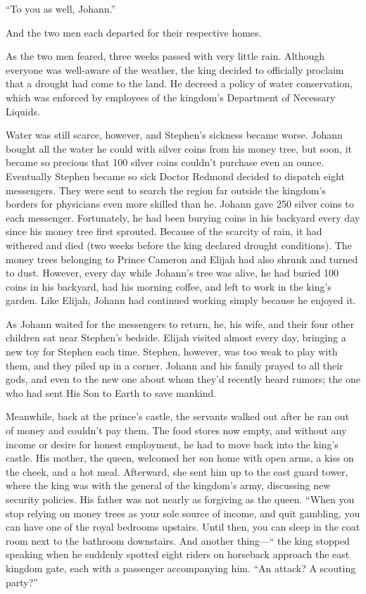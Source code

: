 “To you as well, Johann.”

And the two men each departed for their respective homes.

As the two men feared, three weeks passed with very little rain. Although everyone was well-aware of the weather, the king decided to officially proclaim that a drought had come to the land. He decreed a policy of water conservation, which was enforced by employees of the kingdom's Department of Necessary Liquids.

Water was still scarce, however, and Stephen's sickness became worse. Johann bought all the water he could with silver coins from his money tree, but soon, it became so precious that 100 silver coins couldn't purchase even an ounce. Eventually Stephen became so sick Doctor Redmond decided to dispatch eight messengers. They were sent to search the region far outside the kingdom's borders for physicians even more skilled than he. Johann gave 250 silver coins to each messenger. Fortunately, he had been burying coins in his backyard every day since his money tree first sprouted. Because of the scarcity of rain, it had withered and died (two weeks before the king declared drought conditions). The money trees belonging to Prince Cameron and Elijah had also shrunk and turned to dust. However, every day while Johann's tree was alive, he had buried 100 coins in his backyard, had his morning coffee, and left to work in the king's garden. Like  Elijah, Johann had continued working simply because he enjoyed it.

As Johann waited for the messengers to return, he, his wife, and their four other children sat near Stephen's bedside. Elijah visited almost every day, bringing a new toy for Stephen each time. Stephen, however, was too weak to play with them, and they piled up in a corner. Johann and his family prayed to all their gods, and even to the new one about whom they'd recently heard rumors; the one who had sent His Son to Earth to save mankind.

Meanwhile, back at the prince's castle, the servants walked out after he ran out of money and couldn't pay them. The food stores now empty, and without any income or desire for honest employment, he had to move back into the king's castle. His mother, the queen, welcomed her son home with open arms, a kiss on the cheek, and a hot meal. Afterward, she sent him up to the east guard tower, where the king was with the general of the kingdom's army, discussing new security policies. His father was not nearly as forgiving as the queen. 	“When you stop relying on money trees as your sole source of income, and quit gambling, you can have one of the royal bedrooms upstairs. Until then, you can sleep in the coat room next to the bathroom downstairs. And another thing—“ the king stopped speaking when he suddenly spotted eight riders on horseback approach the east kingdom gate, each with a passenger accompanying him. “An attack? A scouting party?”

